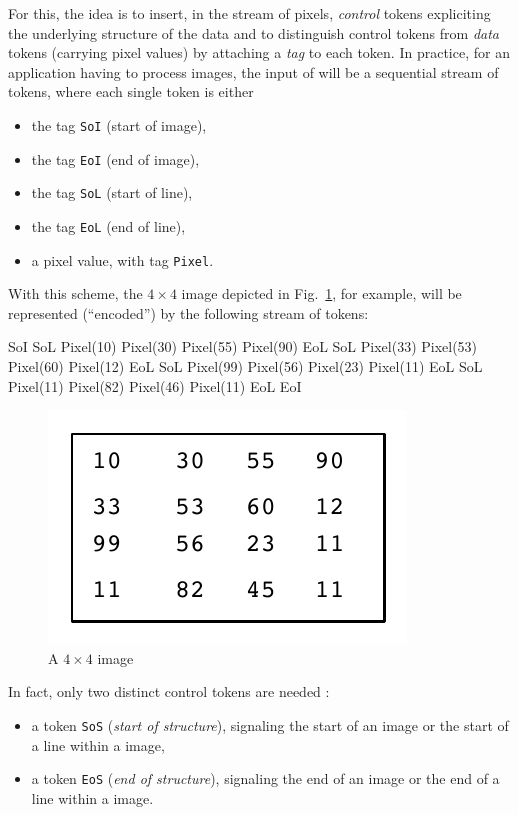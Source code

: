 For this, the idea is to insert, in the stream of pixels, \emph{control} tokens expliciting the
underlying structure of the data and to distinguish control tokens from \emph{data} tokens (carrying
pixel values) by attaching a \emph{tag} to each token. In practice, for an application having to
process images, the input of will be a sequential stream of tokens, where each
single token is either
\begin{itemize}
\item the tag \verb|SoI| (start of image),
\item the tag \verb|EoI| (end of image),
\item the tag \verb|SoL| (start of line),
\item the tag \verb|EoL| (end of line),
\item a pixel value, with tag \verb|Pixel|.
\end{itemize}

With this scheme, the $4 \times 4$ image depicted in Fig.~\ref{fig:img4}, for example, will be
represented (``encoded'') by the following stream of tokens:

\begin{center}
\begin{spverbatim}
SoI SoL Pixel(10) Pixel(30) Pixel(55) Pixel(90) EoL SoL Pixel(33) Pixel(53)
Pixel(60) Pixel(12) EoL SoL Pixel(99) Pixel(56) Pixel(23) Pixel(11) EoL SoL
Pixel(11) Pixel(82) Pixel(46) Pixel(11) EoL  EoI
\end{spverbatim}
\end{center}

\begin{figure}[h]
  \centering
  \includegraphics[width=0.25\linewidth]{figs/img4}
  \caption{A $4 \times 4$ image}
  \label{fig:img4}
\end{figure}

In fact, only two distinct control tokens are needed :

\begin{itemize}
\item a token \verb|SoS| (\emph{start of structure}), signaling the start of an image or the start
  of a line within a image,
\item a token \verb|EoS| (\emph{end of structure}), signaling the end of an image or the end
  of a line within a image.
\end{itemize}


